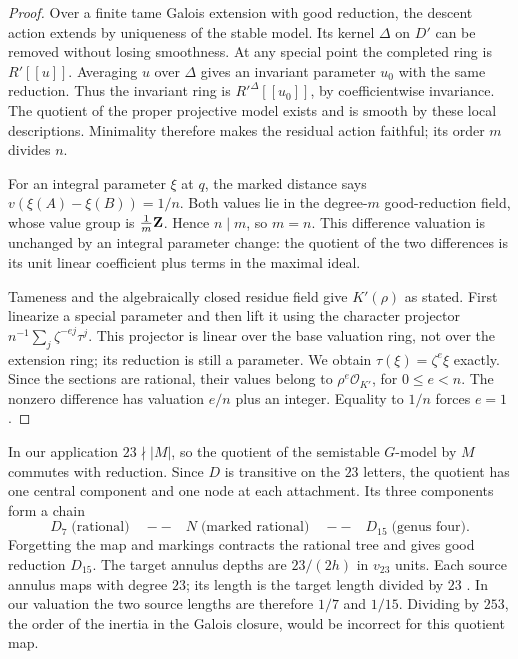 \begin{proof}
Over a finite tame Galois extension with good reduction, the descent
action extends by uniqueness of the stable model.  Its kernel
$\Delta$ on $D'$ can be removed without losing smoothness.
At any special point the completed ring is $R'[[u]]$.
Averaging $u$ over $\Delta$ gives an invariant parameter $u_0$
with the same reduction.  Thus the invariant ring is
$R'^{\Delta}[[u_0]]$, by coefficientwise invariance.  The quotient
of the proper projective model exists and is smooth by these local
descriptions.  Minimality therefore makes the residual action
faithful; its order $m$ divides $n$.

For an integral parameter $\xi$ at $q$, the marked distance says
$v(\xi(A)-\xi(B))=1/n$.  Both values lie in the degree-$m$
good-reduction field, whose value group is $\frac1m\mathbf Z$.
Hence $n\mid m$, so $m=n$.
This difference valuation is unchanged by an integral parameter
change: the quotient of the two differences is its unit linear
coefficient plus terms in the maximal ideal.

Tameness and the algebraically closed residue field give
$K'(\rho)$ as stated.  First linearize a special parameter and then
lift it using the character projector
$n^{-1}\sum_j\zeta^{-ej}\tau^j$.  This projector is linear over
the base valuation ring, not over the extension ring; its reduction
is still a parameter.  We obtain $\tau(\xi)=\zeta^e\xi$ exactly.
Since the sections are rational, their values belong to
$\rho^e\mathcal O_{K'}$, for $0\le e<n$.  The nonzero difference
has valuation $e/n$ plus an integer.  Equality to $1/n$ forces $e=1$.
\end{proof}

In our application $23\nmid|M|$, so the quotient of the semistable
$G$-model by $M$ commutes with reduction.  Since $D$ is transitive
on the $23$ letters, the quotient has one central component and one
node at each attachment.  Its three components form a chain
\[
 D_7\;\text{(rational)}\quad--\quad
 N\;\text{(marked rational)}\quad--\quad D_{15}\;\text{(genus four)}.
\]
Forgetting the map and markings contracts the rational tree and
gives good reduction $D_{15}$.
The target annulus depths are $23/(2h)$ in $v_{23}$ units.
Each source annulus maps with degree $23$; its length is the target
length divided by $23$ \cite[Corollary~2.6]{BPR}.
In our valuation the two source lengths are therefore $1/7$ and
$1/15$.  Dividing by $253$, the order of the inertia in the Galois
closure, would be incorrect for this quotient map.

